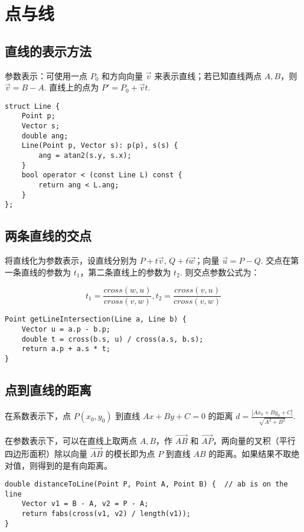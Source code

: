 \section{点与线}
\subsection{直线的表示方法}
参数表示：可使用一点 $P_0$ 和方向向量 $\vec{v}$ 来表示直线；若已知直线两点 $A, B$，则 $\vec{v} = B-A$. 直线上的点为 $P'=P_0 + \vec{v}t$.

\begin{verbatim}
struct Line {
    Point p;
    Vector s;
    double ang;
    Line(Point p, Vector s): p(p), s(s) {
        ang = atan2(s.y, s.x);
    }
    bool operator < (const Line L) const {
        return ang < L.ang;
    }
};

\end{verbatim}

\subsection{两条直线的交点}
将直线化为参数表示，设直线分别为 $P+t\vec{v}$, $Q+t\vec{w}$；向量 $\vec{u} = P-Q$. 交点在第一条直线的参数为 $t_1$，第二条直线上的参数为 $t_2$. 则交点参数公式为：

$$t_1 = \frac{cross(w, u)}{cross(v,w)}, t_2 = \frac{cross(v, u)}{cross(v, w)}$$

\begin{verbatim}
Point getLineIntersection(Line a, Line b) {
    Vector u = a.p - b.p;
    double t = cross(b.s, u) / cross(a.s, b.s);
    return a.p + a.s * t;
}
\end{verbatim}


\subsection{点到直线的距离}
\noindent 在系数表示下，点 $P(x_0, y_0)$ 到直线 $Ax+By+C=0$ 的距离 $d = \frac{|Ax_0+By_0+C|}{\sqrt{A^2+B^2}}$.

\noindent 在参数表示下，可以在直线上取两点 $A, B$，作 $\vec{AB}$ 和 $\vec{AP}$，两向量的叉积（平行四边形面积）除以向量 $\vec{AB}$ 的模长即为点 $P$ 到直线 $AB$ 的距离。如果结果不取绝对值，则得到的是有向距离。

\begin{verbatim}
double distanceToLine(Point P, Point A, Point B) {  // ab is on the line 
    Vector v1 = B - A, v2 = P - A;
    return fabs(cross(v1, v2) / length(v1));
}
\end{verbatim}

